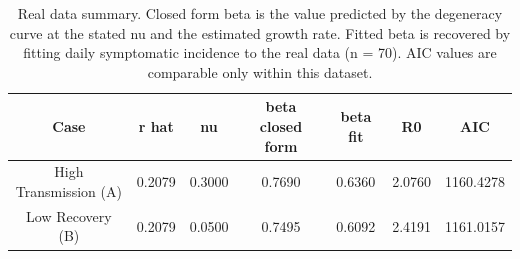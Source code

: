 \begin{table}[!ht]
\centering
\begin{tabular}{ccccccc}
\toprule
Case & r hat & nu & beta closed form & beta fit & R0 & AIC \\
\midrule
High Transmission (A) & 0.2079 & 0.3000 & 0.7690 & 0.6360 & 2.0760 & 1160.4278 \\
Low Recovery (B) & 0.2079 & 0.0500 & 0.7495 & 0.6092 & 2.4191 & 1161.0157 \\
\bottomrule
\end{tabular}
\caption{Real data summary. Closed form beta is the value predicted by the degeneracy curve at the stated nu and the estimated growth rate. Fitted beta is recovered by fitting daily symptomatic incidence to the real data (n = 70). AIC values are comparable only within this dataset.}
\label{tab:realdata_summary}
\end{table}
